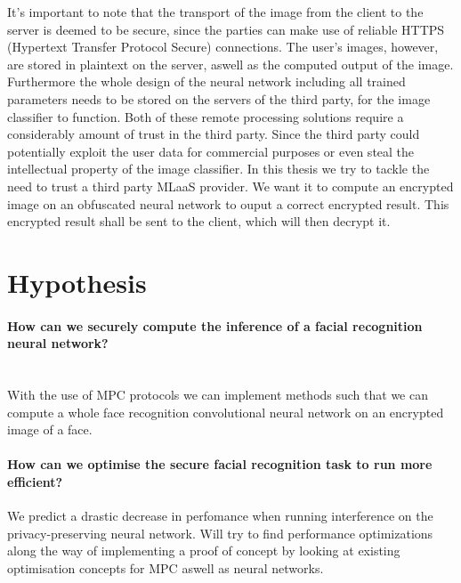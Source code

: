 It's important to note that the transport of the image from the client to the server is deemed to be secure, since the parties can make use of reliable HTTPS (Hypertext Transfer Protocol Secure) connections. The user's images, however, are stored in plaintext on the server, aswell as the computed output of the image. Furthermore the whole design of the neural network including all trained parameters needs to be stored on the servers of the third party, for the image classifier to function. Both of these remote processing solutions require a considerably amount of trust in the third party. Since the third party could potentially exploit the user data for commercial purposes or even steal the intellectual property of the image classifier. In this thesis we try to tackle the need to trust a third party MLaaS provider. We want it to compute an encrypted image on an obfuscated neural network to ouput a correct encrypted result. This encrypted result shall be sent to the client, which will then decrypt it.

\section{Hypothesis}
\paragraph{How can we securely compute the inference of a facial recognition neural network?}\mbox{} \\
With the use of MPC protocols we can implement methods such that we can compute a whole face recognition convolutional neural network on an encrypted image of a face.
\paragraph{How can we optimise the secure facial recognition task to run more efficient?}
We predict a drastic decrease in perfomance when running interference on the privacy-preserving neural network. Will try to find performance optimizations along the way of implementing a proof of concept by looking at existing optimisation concepts for MPC aswell as neural networks.
